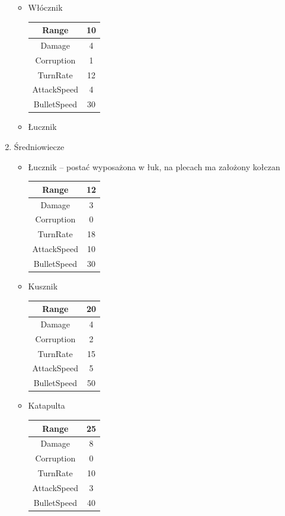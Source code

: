 \documentclass[a4paper,12pt, twoside, titlepage]{article}
\begin{document}
\begin{enumerate}
\begin{itemize}
		\item Włócznik
		\begin{longtable}[l]{|c|c|} 
		\hline
		Range & 10 \\
		\hline
		Damage & 4 \\ 
		\hline 
		Corruption & 1 \\ 
		\hline
		TurnRate & 12 \\ 
		\hline
		AttackSpeed & 4 \\ 
		\hline
		BulletSpeed & 30 \\ 
		\hline
		\end{longtable}	
		\item Łucznik
		
	\end{itemize}

	\item Średniowiecze
	\begin{itemize}
		\item Łucznik -- postać wyposażona w łuk, na plecach ma założony kołczan
		\begin{longtable}[l]{|c|c|} 
		\hline
		Range & 12 \\
		\hline
		Damage & 3 \\ 
		\hline 
		Corruption & 0 \\ 
		\hline
		TurnRate & 18 \\ 
		\hline
		AttackSpeed & 10 \\ 
		\hline
		BulletSpeed & 30 \\ 
		\hline
		\end{longtable}	
		
		\item Kusznik
		\begin{longtable}[l]{|c|c|} 
		\hline
		Range & 20 \\
		\hline
		Damage & 4 \\ 
		\hline 
		Corruption & 2 \\ 
		\hline
		TurnRate & 15 \\ 
		\hline
		AttackSpeed & 5 \\ 
		\hline
		BulletSpeed & 50 \\ 
		\hline
		\end{longtable}		
	\newpage
		\item Katapulta
		\begin{longtable}[l]{|c|c|} 
		\hline
		Range & 25 \\
		\hline
		Damage & 8 \\ 
		\hline 
		Corruption & 0 \\ 
		\hline
		TurnRate & 10 \\ 
		\hline
		AttackSpeed & 3 \\ 
		\hline
		BulletSpeed & 40 \\ 
		\hline
		\end{longtable}	
	\end{itemize}
	
\end{enumerate} 
 
\end{document}
